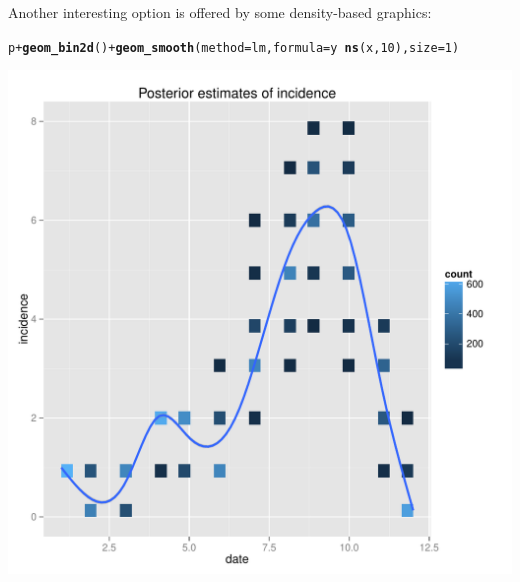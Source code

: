 \documentclass{article}\usepackage[]{graphicx}\usepackage[]{color}
\makeatletter
\newcommand{\hlnum}[1]{\textcolor[rgb]{0.686,0.059,0.569}{#1}}%
\newcommand{\hlopt}[1]{\textcolor[rgb]{0,0,0}{#1}}%
\newcommand{\hlstd}[1]{\textcolor[rgb]{0.345,0.345,0.345}{#1}}%
\newcommand{\hlkwc}[1]{\textcolor[rgb]{0.333,0.667,0.333}{#1}}%
\newcommand{\hlkwd}[1]{\textcolor[rgb]{0.737,0.353,0.396}{\textbf{#1}}}%
\newenvironment{kframe}{%
 \def\at@end@of@kframe{}%
 \ifinner\ifhmode%
  \def\at@end@of@kframe{\end{minipage}}%
  \begin{minipage}{\columnwidth}%
 \fi\fi%
 \def\FrameCommand##1{\hskip\@totalleftmargin \hskip-\fboxsep
 \colorbox{shadecolor}{##1}\hskip-\fboxsep
     \hskip-\linewidth \hskip-\@totalleftmargin \hskip\columnwidth}%
 \MakeFramed {\advance\hsize-\width
   \@totalleftmargin\z@ \linewidth\hsize
   \@setminipage}}%
 {\par\unskip\endMakeFramed%
 \at@end@of@kframe}
\newenvironment{knitrout}{}{} %
\makeatother
\begin{document}
Another interesting option is offered by some density-based graphics:
\begin{knitrout}
\color{fgcolor}\begin{kframe}
\begin{alltt}
\hlstd{p} \hlopt{+} \hlkwd{geom_bin2d}\hlstd{()} \hlopt{+} \hlkwd{geom_smooth}\hlstd{(}\hlkwc{method}\hlstd{=lm,} \hlkwc{formula}\hlstd{=y}\hlopt{~}\hlkwd{ns}\hlstd{(x,}\hlnum{10}\hlstd{),} \hlkwc{size}\hlstd{=}\hlnum{1}\hlstd{)}
\end{alltt}
\end{kframe}

{\centering \includegraphics[width=.6\textwidth]{figs/unnamed-chunk-51} 

}



\end{knitrout}
\end{document}
